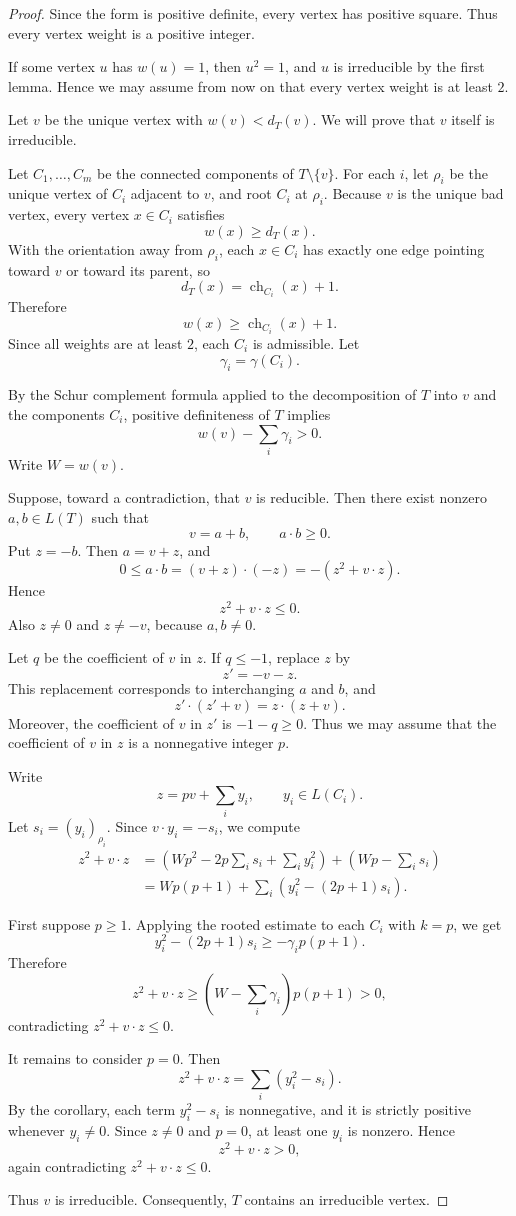 \documentclass[12pt]{article}
\DeclareMathOperator{\ch}{ch}
\begin{document}
\begin{proof}
Since the form is positive definite, every vertex has positive square. Thus every vertex weight is a positive integer.

If some vertex \(u\) has \(w(u)=1\), then \(u^2=1\), and \(u\) is irreducible by the first lemma. Hence we may assume from now on that every vertex weight is at least \(2\).

Let \(v\) be the unique vertex with \(w(v)<d_T(v)\). We will prove that \(v\) itself is irreducible.

Let \(C_1,\dots,C_m\) be the connected components of \(T\setminus\{v\}\). For each \(i\), let \(\rho_i\) be the unique vertex of \(C_i\) adjacent to \(v\), and root \(C_i\) at \(\rho_i\). Because \(v\) is the unique bad vertex, every vertex \(x\in C_i\) satisfies
\[
w(x)\ge d_T(x).
\]
With the orientation away from \(\rho_i\), each \(x\in C_i\) has exactly one edge pointing toward \(v\) or toward its parent, so
\[
d_T(x)=\ch_{C_i}(x)+1.
\]
Therefore
\[
w(x)\ge \ch_{C_i}(x)+1.
\]
Since all weights are at least \(2\), each \(C_i\) is admissible. Let
\[
\gamma_i=\gamma(C_i).
\]

By the Schur complement formula applied to the decomposition of \(T\) into \(v\) and the components \(C_i\), positive definiteness of \(T\) implies
\[
w(v)-\sum_i\gamma_i>0.
\]
Write \(W=w(v)\).

Suppose, toward a contradiction, that \(v\) is reducible. Then there exist nonzero \(a,b\in L(T)\) such that
\[
v=a+b,
\qquad
a\cdot b\ge 0.
\]
Put \(z=-b\). Then \(a=v+z\), and
\[
0\le a\cdot b=(v+z)\cdot(-z)=-(z^2+v\cdot z).
\]
Hence
\[
z^2+v\cdot z\le 0.
\]
Also \(z\ne 0\) and \(z\ne -v\), because \(a,b\ne 0\).

Let \(q\) be the coefficient of \(v\) in \(z\). If \(q\le -1\), replace \(z\) by
\[
z'=-v-z.
\]
This replacement corresponds to interchanging \(a\) and \(b\), and
\[
z'\cdot(z'+v)=z\cdot(z+v).
\]
Moreover, the coefficient of \(v\) in \(z'\) is \(-1-q\ge 0\). Thus we may assume that the coefficient of \(v\) in \(z\) is a nonnegative integer \(p\).

Write
\[
z=pv+\sum_i y_i,
\qquad y_i\in L(C_i).
\]
Let \(s_i=(y_i)_{\rho_i}\). Since \(v\cdot y_i=-s_i\), we compute
\begin{align*}
z^2+v\cdot z
&=
\left(Wp^2-2p\sum_i s_i+\sum_i y_i^2\right)
+
\left(Wp-\sum_i s_i\right) \\
&=
Wp(p+1)+\sum_i\left(y_i^2-(2p+1)s_i\right).
\end{align*}

First suppose \(p\ge 1\). Applying the rooted estimate to each \(C_i\) with \(k=p\), we get
\[
y_i^2-(2p+1)s_i\ge -\gamma_i p(p+1).
\]
Therefore
\[
z^2+v\cdot z
\ge
\left(W-\sum_i\gamma_i\right)p(p+1)>0,
\]
contradicting \(z^2+v\cdot z\le 0\).

It remains to consider \(p=0\). Then
\[
z^2+v\cdot z
=
\sum_i (y_i^2-s_i).
\]
By the corollary, each term \(y_i^2-s_i\) is nonnegative, and it is strictly positive whenever \(y_i\ne 0\). Since \(z\ne 0\) and \(p=0\), at least one \(y_i\) is nonzero. Hence
\[
z^2+v\cdot z>0,
\]
again contradicting \(z^2+v\cdot z\le 0\).

Thus \(v\) is irreducible. Consequently, \(T\) contains an irreducible vertex.
\end{proof}
\end{document}
